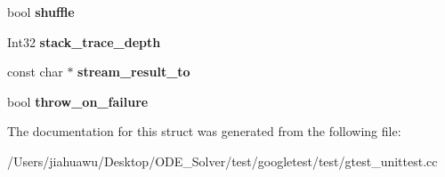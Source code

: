 \begin{DoxyCompactItemize}
\mbox{\label{structtesting_1_1_flags_a51c689e47e0f55c16116ac2a1d3b05d6}} 
bool {\bfseries shuffle}
\item 
\mbox{\label{structtesting_1_1_flags_a20c6592453909c1adace64bf6a2bc2de}} 
Int32 {\bfseries stack\+\_\+trace\+\_\+depth}
\item 
\mbox{\label{structtesting_1_1_flags_ab09849fd3e095d5628dec65ec4dce9e1}} 
const char $\ast$ {\bfseries stream\+\_\+result\+\_\+to}
\item 
\mbox{\label{structtesting_1_1_flags_ab8e7d21e31e641efe47b8050759e001a}} 
bool {\bfseries throw\+\_\+on\+\_\+failure}
\end{DoxyCompactItemize}


The documentation for this struct was generated from the following file\+:\begin{DoxyCompactItemize}
\item 
/\+Users/jiahuawu/\+Desktop/\+O\+D\+E\+\_\+\+Solver/test/googletest/test/gtest\+\_\+unittest.\+cc\end{DoxyCompactItemize}
